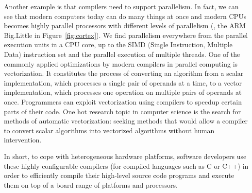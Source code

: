 Another example is that compilers need to support parallelism. In fact, we can see that modern computers today can do many things at once and modern CPUs becomes highly parallel processors with different levels of parallelism (\eg, the ARM Big.Little in Figure~\ref{fig:cortex}). We find parallelism everywhere from the parallel execution units in a CPU core, up to the SIMD (Single Instruction, Multiple Data) instruction set and the parallel execution of multiple threads.  One of the commonly applied optimizations by modern compilers in parallel computing is vectorization. It constitutes the process of converting an algorithm from a scalar implementation, which processes a single pair of operands at a time, to a vector implementation, which processes one operation on multiple pairs of operands at once.
Programmers can exploit vectorization using compilers to speedup certain parts of their code. One hot research topic in computer science is the search for methods of automatic vectorization\cite{nuzman2006auto}: seeking methods that would allow a compiler to convert scalar algorithms into vectorized algorithms without human intervention.


In short, to cope with heterogeneous hardware platforms, software developers use these highly configurable compilers (for compiled languages such as C or C++) in order to efficiently compile their high-level source code programs and execute them on top of a board range of platforms and processors. 


